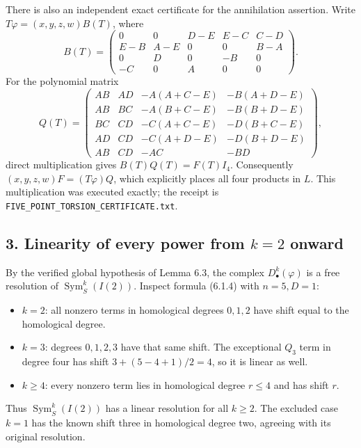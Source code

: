 \documentclass[
  10pt,
]{article}
\providecommand{\tightlist}{%
  \setlength{\itemsep}{0pt}\setlength{\parskip}{0pt}}
\providecommand{\tightlist}{\setlength{\itemsep}{0pt}\setlength{\parskip}{0pt}}
\begin{document}
There is also an independent exact certificate for the annihilation
assertion. Write \(T\varphi=(x,y,z,w)B(T)\), where \[
B(T)=\begin{pmatrix}
0&0&D-E&E-C&C-D\\
E-B&A-E&0&0&B-A\\
0&D&0&-B&0\\
-C&0&A&0&0
\end{pmatrix}.
\] For the polynomial matrix \[
Q(T)=\begin{pmatrix}
AB&AD&-A(A+C-E)&-B(A+D-E)\\
AB&BC&-A(B+C-E)&-B(B+D-E)\\
BC&CD&-C(A+C-E)&-D(B+C-E)\\
AD&CD&-C(A+D-E)&-D(B+D-E)\\
AB&CD&-AC&-BD
\end{pmatrix},
\] direct multiplication gives \(B(T)Q(T)=F(T)I_4\). Consequently
\((x,y,z,w)F=(T\varphi)Q\), which explicitly places all four products in
\(L\). This multiplication was executed exactly; the receipt is
\texttt{\small FIVE\_\allowbreak{}POINT\_\allowbreak{}TORSION\_\allowbreak{}CERTIFICATE.txt}.

\subsection{\texorpdfstring{3. Linearity of every power from \(k=2\)
onward}{3. Linearity of every power from k=2 onward}}\label{linearity-of-every-power-from-k2-onward}

By the verified global hypothesis of Lemma 6.3, the complex
\(D^k_\bullet(\varphi)\) is a free resolution of
\(\operatorname{Sym}^k_S(I(2))\). Inspect formula (6.1.4) with
\(n=5,D=1\):

\begin{itemize}
\tightlist
\item
  \(k=2\): all nonzero terms in homological degrees \(0,1,2\) have shift
  equal to the homological degree.
\item
  \(k=3\): degrees \(0,1,2,3\) have that same shift. The exceptional
  \(Q_3\) term in degree four has shift \(3+(5-4+1)/2=4\), so it is
  linear as well.
\item
  \(k\ge4\): every nonzero term lies in homological degree \(r\le4\) and
  has shift \(r\).
\end{itemize}

Thus \(\operatorname{Sym}^k_S(I(2))\) has a linear resolution for all
\(k\ge2\). The excluded case \(k=1\) has the known shift three in
homological degree two, agreeing with its original resolution.
\end{document}
